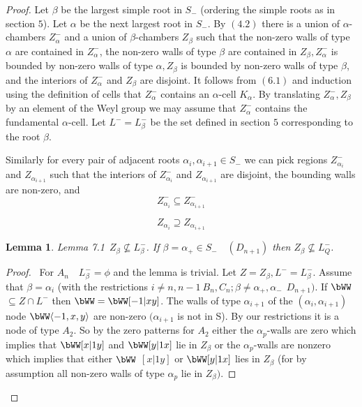 \documentclass{memo-l}
\newtheorem{lemma}[theorem]{Lemma}
\theoremstyle{definition}
\theoremstyle{remark}
\numberwithin{section}{chapter}
\numberwithin{equation}{chapter}
\begin{document}
\begin{proof}
   Let ${\beta}$ be the largest simple root in $S_{-}$  (ordering the
simple roots as in section $5$).  Let ${\alpha}$ be the next largest root in
$S_{-}$.  By $(4.2)$ there is a union of ${\alpha}$-chambers
$Z_{{\alpha}}^{-}$ and a union of ${\beta}$-chambers $Z_{{\beta}}$ such
that the non-zero walls of type ${\alpha}$ are contained in
$Z_{{\alpha}}^{-}$, the non-zero walls of type ${\beta}$ are contained in
$Z_{{\beta}}, Z_{{\alpha}}^{-}$ is bounded by non-zero walls of type
${\alpha}, Z_{{\beta}}$ is bounded by non-zero walls of type ${\beta}$, and
the interiors of $Z_{{\alpha}}^{-}$ and $Z_{{\beta}}$ are disjoint.  It
follows from $(6.1)$ and induction using the definition of cells that
$Z_{{\alpha}}^{-}$ contains an ${\alpha}$-cell $K_{{\alpha}}$.  By
translating $Z_{{\alpha}}^{-}, Z_{{\beta}}$ by an element of the Weyl group
we may assume that $Z_{{\alpha}}^{-}$ contains the fundamental
${\alpha}$-cell.  Let $L^{-} = L_{{\beta}}^{-}$ be the set defined in
section $5$ corresponding to the root ${\beta}$.

   Similarly for every pair of adjacent roots ${\alpha}_{i},
{\alpha}_{i+1}  \in  S_{-}$ we can pick regions $Z_{{\alpha_i}} ^{-}$
and $Z_{{\alpha_{i+1}}} ^{ }$ such that the interiors of $Z_{{\alpha_i}}
^{-}$ and $Z_{{\alpha_{i+1}}}$ are disjoint, the bounding walls are
non-zero, and
$$
Z_{{\alpha_i}} ^{-} {\subseteq} Z_{{\alpha_{i+1}}} ^{-}$$

$$Z_{{\alpha_i}} {\supseteq} Z_{{\alpha_{i+1}}}$$

\medpagebreak


\begin{lemma}{Lemma 7.1}\ $Z_{{\beta}}{\not\subseteq}L_{{\beta}}^{-}$.  If
${\beta} = {\alpha}_{+}  \in  S_{-} \quad (D_{n+1})$ then
$Z_{{\beta}}{\not\subseteq}L_{Q}^{-}$.
\end{lemma}


\begin{proof} \ For $A_{n} \quad L_{{\beta}}^{-} = {\phi}$ and the lemma is
trivial.  Let $Z=Z_{{\beta}}, L^{-} = L_{{\beta}}^{-}$.  Assume that
${\beta} = {\alpha}_{i}$ (with the restrictions $i\ne n,n-1 \  B_{n},C_{n};
{\beta}\ne {\alpha}_{+},{\alpha}_{-} \ \ D_{n+1})$.  If $\bWW$
${\subseteq}Z \cap L^{-}$ then $\bWW= \bWW[-1\vert xy]$.  The
walls of type ${\alpha}_{i+1}$ of the $({\alpha}_{i},{\alpha}_{i+1})$ node
$\bWW\langle -1,x,y\rangle$ are non-zero $({\alpha}_{i+1}$ is not in S).  By our
restrictions it is a node of type $A_{2}$.  So by the zero patterns for
$A_{2}$ either the ${\alpha}_{p}$-walls are zero which implies that
$\bWW[x\vert 1y]$ and $\bWW[y\vert 1x]$ lie in $Z_{{\beta}}$ or the
${\alpha}_{p}$-walls are nonzero which implies that either $\bWW$
$[x\vert 1y]$ or $\bWW[y\vert 1x]$ lies in $Z_{{\beta}}$
(for by
assumption all non-zero walls of type ${\alpha}_{p}$ lie in $Z_{{\beta}})$.



\end{proof}
\end{proof}
\end{document}
